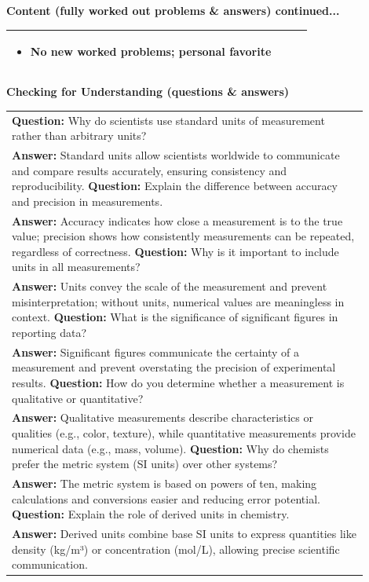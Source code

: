 \documentclass{article}
\begin{document}
\vspace{0.5cm}
\noindent
{\large \textbf{Content (fully worked out problems \& answers) continued...} \\
\begin{tabular}{|p{0.9\linewidth}|}
\hline
\begin{itemize}
    \item No new worked problems; personal favorite
\end{itemize}
\\ \hline
\end{tabular}
\newpage
\noindent
{\large \textbf{Checking for Understanding (questions \& answers)}} \\
\begin{tabular}{|p{0.9\linewidth}|}
\hline
    \textbf{Question:} Why do scientists use standard units of measurement rather than arbitrary units? \\
    \textbf{Answer:} Standard units allow scientists worldwide to communicate and compare results accurately, ensuring consistency and reproducibility.
    \hline
    \textbf{Question:} Explain the difference between accuracy and precision in measurements. \\
    \textbf{Answer:} Accuracy indicates how close a measurement is to the true value; precision shows how consistently measurements can be repeated, regardless of correctness.
    \hline
    \textbf{Question:} Why is it important to include units in all measurements? \\
    \textbf{Answer:} Units convey the scale of the measurement and prevent misinterpretation; without units, numerical values are meaningless in context.
    \hline
    \textbf{Question:} What is the significance of significant figures in reporting data? \\
    \textbf{Answer:} Significant figures communicate the certainty of a measurement and prevent overstating the precision of experimental results.
    \hline
    \textbf{Question:} How do you determine whether a measurement is qualitative or quantitative? \\
    \textbf{Answer:} Qualitative measurements describe characteristics or qualities (e.g., color, texture), while quantitative measurements provide numerical data (e.g., mass, volume).
    \hline
    \textbf{Question:} Why do chemists prefer the metric system (SI units) over other systems? \\
    \textbf{Answer:} The metric system is based on powers of ten, making calculations and conversions easier and reducing error potential.
    \hline
    \textbf{Question:} Explain the role of derived units in chemistry. \\
    \textbf{Answer:} Derived units combine base SI units to express quantities like density (kg/m³) or concentration (mol/L), allowing precise scientific communication.
\\ \hline
\end{tabular}
\newpage
\noindent
}
\end{document}
